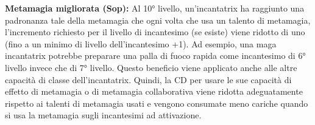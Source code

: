 \documentclass[a4paper]{report}
\begin{document}
\begin{multicols}{2}
\textbf{Metamagia migliorata (Sop):} Al 10° livello, un'incantatrix ha raggiunto una padronanza tale della metamagia che ogni volta che usa un talento di metamagia, l'incremento richiesto per il livello di incantesimo (se esiste) viene ridotto di uno (fino a un minimo di livello dell'incantesimo +1). Ad esempio, una maga incantatrix potrebbe preparare una palla di fuoco rapida come incantesimo di 6° livello invece che di 7° livello.
Questo beneficio viene applicato anche alle altre capacità di classe dell'incantatrix. Quindi, la CD per usare le sue capacità di effetto di metamagia o di metamagia collaborativa viene ridotta adeguatamente rispetto ai talenti di metamagia usati e vengono consumate meno cariche quando si usa la metamagia sugli incantesimi ad attivazione.\\

\end{multicols}
\end{document}
